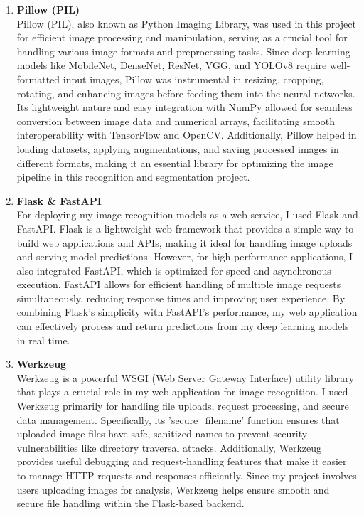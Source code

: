 \begin{enumerate}
	\item \textbf{Pillow (PIL)} \\
	Pillow (PIL), also known as Python Imaging Library, was used in this project for efficient image processing and manipulation, serving as a crucial tool for handling various image formats and preprocessing tasks. Since deep learning models like MobileNet, DenseNet, ResNet, VGG, and YOLOv8 require well-formatted input images, Pillow was instrumental in resizing, cropping, rotating, and enhancing images before feeding them into the neural networks. Its lightweight nature and easy integration with NumPy allowed for seamless conversion between image data and numerical arrays, facilitating smooth interoperability with TensorFlow and OpenCV. Additionally, Pillow helped in loading datasets, applying augmentations, and saving processed images in different formats, making it an essential library for optimizing the image pipeline in this recognition and segmentation project.
	
	\item \textbf{Flask \& FastAPI} \\
	For deploying my image recognition models as a web service, I used Flask and FastAPI. Flask is a lightweight web framework that provides a simple way to build web applications and APIs, making it ideal for handling image uploads and serving model predictions. However, for high-performance applications, I also integrated FastAPI, which is optimized for speed and asynchronous execution. FastAPI allows for efficient handling of multiple image requests simultaneously, reducing response times and improving user experience. By combining Flask's simplicity with FastAPI's performance, my web application can effectively process and return predictions from my deep learning models in real time.
	
	\item \textbf{Werkzeug} \\
	Werkzeug is a powerful WSGI (Web Server Gateway Interface) utility library that plays a crucial role in my web application for image recognition. I used Werkzeug primarily for handling file uploads, request processing, and secure data management. Specifically, its 'secure\_filename' function ensures that uploaded image files have safe, sanitized names to prevent security vulnerabilities like directory traversal attacks. Additionally, Werkzeug provides useful debugging and request-handling features that make it easier to manage HTTP requests and responses efficiently. Since my project involves users uploading images for analysis, Werkzeug helps ensure smooth and secure file handling within the Flask-based backend.
	

\end{enumerate}
